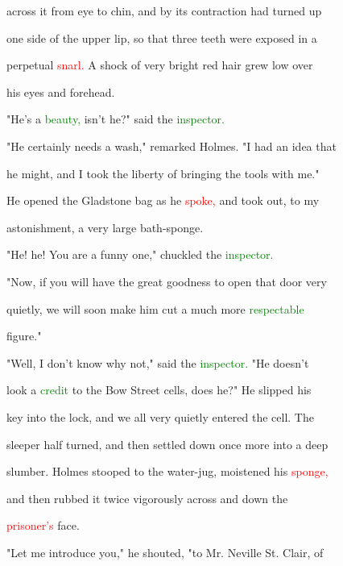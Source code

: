  across it from eye to chin, and by its contraction had turned up

 one side of the upper lip, so that three teeth were \textcolor{BurntOrange}{exposed} in a

 perpetual \textcolor{red}{snarl.} A \textcolor{BurntOrange}{shock} of very bright red hair \textcolor{BurntOrange}{grew} low over

 his eyes and forehead.



 "He's a \textcolor{green}{beauty,} isn't he?" said the \textcolor{green}{inspector.}



 "He certainly needs a wash," remarked Holmes. "I had an idea that

 he might, and I took the \textcolor{BurntOrange}{liberty} of bringing the tools with me."

 He opened the Gladstone bag as he \textcolor{red}{spoke,} and took out, to my

 \textcolor{BurntOrange}{astonishment,} a very large bath-sponge.



 "He! he! You are a funny one," \textcolor{BurntOrange}{chuckled} the \textcolor{green}{inspector.}



 "Now, if you will have the great \textcolor{BurntOrange}{goodness} to open that door very

 quietly, we will soon make him cut a much more \textcolor{green}{respectable}

 figure."



 "Well, I don't know why not," said the \textcolor{green}{inspector.} "He doesn't

 look a \textcolor{green}{credit} to the Bow Street cells, does he?" He \textcolor{BurntOrange}{slipped} his

 key into the lock, and we all very quietly entered the cell. The

 sleeper half turned, and then settled down once more into a deep

 slumber. Holmes stooped to the water-jug, moistened his \textcolor{red}{sponge,}

 and then rubbed it twice vigorously across and down the

 \textcolor{red}{prisoner's} face.



 "Let me introduce you," he \textcolor{BurntOrange}{shouted,} "to Mr. Neville St. Clair, of

